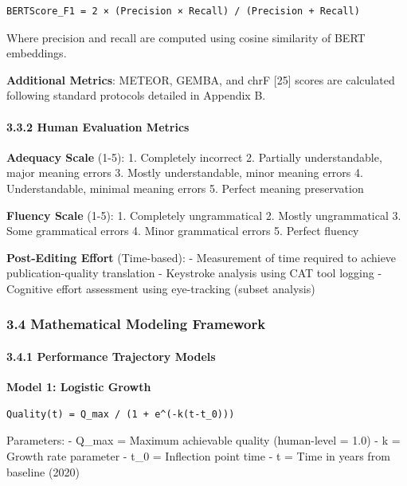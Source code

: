\documentclass[12pt,a4paper]{article}
\begin{document}
{{\begin{verbatim}
BERTScore_F1 = 2 × (Precision × Recall) / (Precision + Recall)
\end{verbatim}

Where precision and recall are computed using cosine similarity of BERT
embeddings.

\textbf{Additional Metrics}: METEOR, GEMBA, and chrF {[}25{]} scores are
calculated following standard protocols detailed in Appendix B.

\hypertarget{human-evaluation-metrics}{%
\paragraph{3.3.2 Human Evaluation
Metrics}\label{human-evaluation-metrics}}

\textbf{Adequacy Scale} (1-5): 1. Completely incorrect 2. Partially
understandable, major meaning errors 3. Mostly understandable, minor
meaning errors 4. Understandable, minimal meaning errors 5. Perfect
meaning preservation

\textbf{Fluency Scale} (1-5): 1. Completely ungrammatical 2. Mostly
ungrammatical 3. Some grammatical errors 4. Minor grammatical errors 5.
Perfect fluency

\textbf{Post-Editing Effort} (Time-based): - Measurement of time
required to achieve publication-quality translation - Keystroke analysis
using CAT tool logging - Cognitive effort assessment using eye-tracking
(subset analysis)

\hypertarget{mathematical-modeling-framework}{%
\subsubsection{3.4 Mathematical Modeling
Framework}\label{mathematical-modeling-framework}}

\hypertarget{performance-trajectory-models}{%
\paragraph{3.4.1 Performance Trajectory
Models}\label{performance-trajectory-models}}

\textbf{Model 1: Logistic Growth}

\begin{verbatim}
Quality(t) = Q_max / (1 + e^(-k(t-t_0)))
\end{verbatim}

Parameters: - Q\_max = Maximum achievable quality (human-level = 1.0) -
k = Growth rate parameter - t\_0 = Inflection point time - t = Time in
years from baseline (2020)

}}
\end{document}
